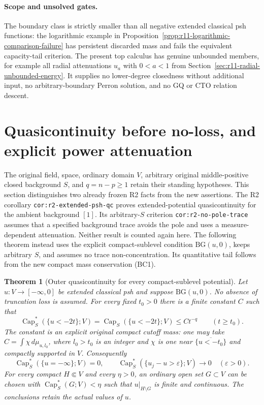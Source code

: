 \documentclass[11pt,a4paper]{article}
\numberwithin{equation}{section}
\newtheorem{theorem}{Theorem}[section]
\theoremstyle{definition}
\theoremstyle{remark}
\begin{document}
\paragraph{Scope and unsolved gates.}
The boundary class is strictly smaller than all negative extended
classical psh functions: the logarithmic example in
Proposition~\ref{prop:r11-logarithmic-comparison-failure} has
persistent discarded mass and fails the equivalent capacity-tail
criterion. The present top calculus has genuine unbounded members,
for example all radial attenuations $u_a$ with $0<a<1$ from
Section~\ref{sec:r11-radial-unbounded-energy}. It supplies no lower-degree
closedness without additional input, no arbitrary-boundary Perron
solution, and no GQ or CTO relation descent.



\section{Quasicontinuity before no-loss, and explicit power attenuation}
\label{sec:r11-boundary-gap-quasicontinuity}

The original field, space, ordinary domain $V$, arbitrary original
middle-positive closed background $S$, and $q=n-p\geq1$ retain
their standing hypotheses. This section distinguishes two already
frozen R2 facts from the new assertions. The R2 corollary
\texttt{cor:r2-extended-psh-qc} proves extended-potential
quasicontinuity for the ambient background $[1]$. Its arbitrary-$S$
criterion \texttt{cor:r2-no-pole-trace} assumes that a specified
background trace avoids the pole and uses a measure-dependent
attenuation. Neither result is counted again here. The following
theorem instead uses the explicit compact-sublevel condition
$\mathrm{BG}(u,0)$, keeps arbitrary $S$, and assumes no trace
non-concentration. Its quantitative tail follows from the new
compact mass conservation (BC1).

\begin{theorem}[Outer quasicontinuity for every compact-sublevel potential]
\label{thm:r11-BG-outer-quasicontinuity}
Let $u:V\to[-\infty,0]$ be extended classical psh and suppose
$\mathrm{BG}(u,0)$. No absence of truncation loss is assumed.
For every fixed $t_0>0$ there is a finite constant $C$ such that
\[
             \operatorname{Cap}_S^*(\{u<-2t\};V)
               =\operatorname{Cap}_S(\{u<-2t\};V)
                       \leq C t^{-q}\qquad(t\geq t_0).
 \tag{BQ1}
\]
The constant is an explicit original compact cutoff mass:
one may take $C=\int\chi\,d\mu_{u,l_0}$, where
$l_0>t_0$ is an integer and $\chi$ is one near
$\overline{\{u<-t_0\}}$ and compactly supported in $V$.
Consequently
\[
 \operatorname{Cap}_S^*(\{u=-\infty\};V)=0,
 \qquad
 \operatorname{Cap}_S^*(\{u_j-u>\varepsilon\};V)\to0
                           \quad(\varepsilon>0).
 \tag{BQ2}
\]
For every compact $H\Subset V$ and every $\eta>0$, an ordinary
open set $G\subset V$ can be chosen with
$\operatorname{Cap}_S^*(G;V)<\eta$ such that
$u|_{H\setminus G}$ is finite and continuous.
The conclusions retain the actual values of $u$.
\end{theorem}
\end{document}
